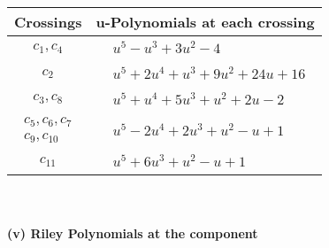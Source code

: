 \documentclass[1p]{elsarticle_modified}
\theoremstyle{definition}
\begin{document}
\begin{tabular}{m{50pt}|m{274pt}}
Crossings & \hspace{64pt}u-Polynomials at each crossing \\
\hline $$\begin{aligned}c_{1},c_{4}\end{aligned}$$&$\begin{aligned}
&u^5- u^3+3 u^2-4
\end{aligned}$\\
\hline $$\begin{aligned}c_{2}\end{aligned}$$&$\begin{aligned}
&u^5+2 u^4+u^3+9 u^2+24 u+16
\end{aligned}$\\
\hline $$\begin{aligned}c_{3},c_{8}\end{aligned}$$&$\begin{aligned}
&u^5+u^4+5 u^3+u^2+2 u-2
\end{aligned}$\\
\hline $$\begin{aligned}c_{5},c_{6},c_{7}\\c_{9},c_{10}\end{aligned}$$&$\begin{aligned}
&u^5-2 u^4+2 u^3+u^2- u+1
\end{aligned}$\\
\hline $$\begin{aligned}c_{11}\end{aligned}$$&$\begin{aligned}
&u^5+6 u^3+u^2- u+1
\end{aligned}$\\
\hline
\end{tabular}\\~\\
\newpage\renewcommand{\arraystretch}{1}
\flushleft \textbf{(v) Riley Polynomials at the component}\newline \\
\end{document}
